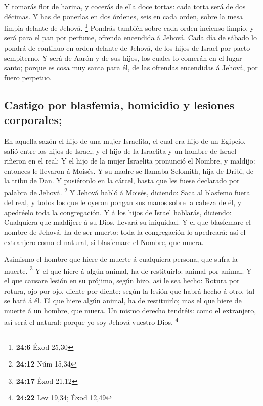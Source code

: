  Y tomarás flor de harina, y cocerás de ella doce tortas:
cada torta será de dos décimas.  Y has de ponerlas en dos
órdenes, seis en cada orden, sobre la mesa limpia delante de Jehová.
\footnote{\textbf{24:6} Éxod 25,30}  Pondrás también sobre
cada orden incienso limpio, y será para el pan por perfume, ofrenda
encendida á Jehová.  Cada día de sábado lo pondrá de
continuo en orden delante de Jehová, de los hijos de Israel por pacto
sempiterno.  Y será de Aarón y de sus hijos, los cuales lo
comerán en el lugar santo; porque es cosa muy santa para él, de las
ofrendas encendidas á Jehová, por fuero perpetuo.

\hypertarget{castigo-por-blasfemia-homicidio-y-lesiones-corporales}{%
\subsection{Castigo por blasfemia, homicidio y lesiones
corporales;}\label{castigo-por-blasfemia-homicidio-y-lesiones-corporales}}

 En aquella sazón el hijo de una mujer Israelita, el cual
era hijo de un Egipcio, salió entre los hijos de Israel; y el hijo de la
Israelita y un hombre de Israel riñeron en el real:  Y el
hijo de la mujer Israelita pronunció el Nombre, y maldijo: entonces le
llevaron á Moisés. Y su madre se llamaba Selomith, hija de Dribi, de la
tribu de Dan.  Y pusiéronlo en la cárcel, hasta que les
fuese declarado por palabra de Jehová. \footnote{\textbf{24:12} Núm
  15,34}  Y Jehová habló á Moisés, diciendo: 
Saca al blasfemo fuera del real, y todos los que le oyeron pongan sus
manos sobre la cabeza de él, y apedréelo toda la congregación.
 Y á los hijos de Israel hablarás, diciendo: Cualquiera que
maldijere á su Dios, llevará su iniquidad.  Y el que
blasfemare el nombre de Jehová, ha de ser muerto: toda la congregación
lo apedreará: así el extranjero como el natural, si blasfemare el
Nombre, que muera.

 Asimismo el hombre que hiere de muerte á cualquiera
persona, que sufra la muerte. \footnote{\textbf{24:17} Éxod 21,12}
 Y el que hiere á algún animal, ha de restituirlo: animal
por animal.  Y el que causare lesión en su prójimo, según
hizo, así le sea hecho:  Rotura por rotura, ojo por ojo,
diente por diente: según la lesión que habrá hecho á otro, tal se hará á
él.  El que hiere algún animal, ha de restituirlo; mas el
que hiere de muerte á un hombre, que muera.  Un mismo
derecho tendréis: como el extranjero, así será el natural: porque yo soy
Jehová vuestro Dios. \footnote{\textbf{24:22} Lev 19,34; Éxod 12,49}

